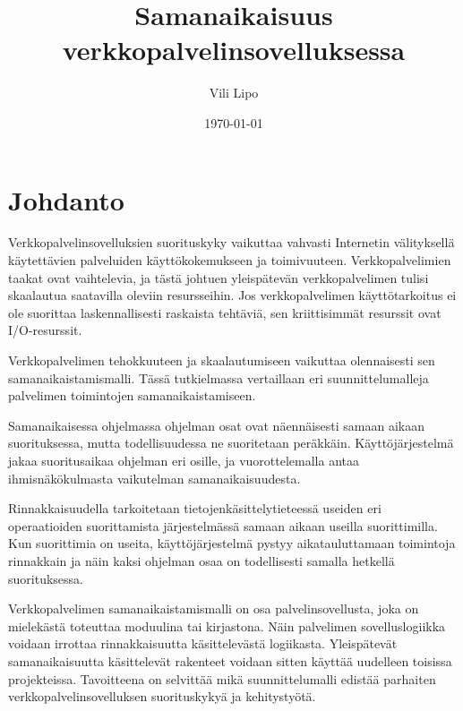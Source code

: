 \documentclass[finnish]{tktltiki2}
\title{Samanaikaisuus verkkopalvelinsovelluksessa}
\author{Vili Lipo}
\date{\today}
\theoremstyle{definition}
\theoremstyle{remark}
\begin{document}
\frontmatter      %

\maketitle        %
\makeabstract     %

\tableofcontents  %


\mainmatter       %

\section{Johdanto}
Verkkopalvelinsovelluksien suorituskyky vaikuttaa vahvasti
Internetin välityksellä käytettävien palveluiden käyttökokemukseen ja toimivuuteen.
Verkkopalvelimien taakat ovat vaihtelevia, ja tästä johtuen
yleispätevän verkkopalvelimen tulisi skaalautua saatavilla oleviin resursseihin.
Jos verkkopalvelimen käyttötarkoitus ei ole suorittaa laskennallisesti raskaista
tehtäviä, sen
kriittisimmät resurssit ovat I/O-resurssit.

Verkkopalvelimen tehokkuuteen ja skaalautumiseen vaikuttaa olennaisesti
sen samanaikaistamismalli. Tässä
tutkielmassa vertaillaan eri suunnittelumalleja palvelimen toimintojen samanaikaistamiseen.

Samanaikaisessa ohjelmassa ohjelman osat ovat näennäisesti samaan
aikaan suorituksessa, mutta todellisuudessa ne suoritetaan peräkkäin.
Käyttöjärjestelmä jakaa suoritusaikaa ohjelman eri osille,
ja vuorottelemalla antaa ihmisnäkökulmasta vaikutelman samanaikaisuudesta.

Rinnakkaisuudella tarkoitetaan tietojenkäsittelytieteessä useiden
eri operaatioiden suorittamista järjestelmässä samaan aikaan useilla suorittimilla.
Kun suorittimia
on useita, käyttöjärjestelmä pystyy aikatauluttamaan toimintoja
rinnakkain ja näin kaksi ohjelman osaa on todellisesti
samalla hetkellä suorituksessa.

Verkkopalvelimen samanaikaistamismalli on osa palvelinsovellusta,
joka on mielekästä toteuttaa moduulina tai kirjastona.
Näin palvelimen sovelluslogiikka voidaan irrottaa rinnakkaisuutta
käsittelevästä logiikasta. Yleispätevät
samanaikaisuutta käsittelevät rakenteet voidaan sitten
käyttää uudelleen toisissa projekteissa.
Tavoitteena on selvittää mikä suunnittelumalli edistää
parhaiten verkkopalvelinsovelluksen suorituskykyä ja
kehitystyötä.
\end{document}
